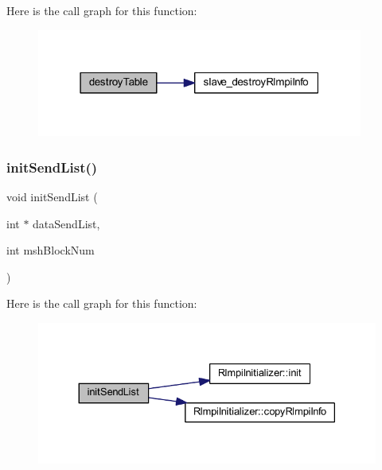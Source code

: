 Here is the call graph for this function\+:
\nopagebreak
\begin{figure}[H]
\begin{center}
\leavevmode
\includegraphics[width=304pt]{tools_2RL__MPI_2register_8H_a099f07ebad307cc1509766f32cfcba5f_cgraph}
\end{center}
\end{figure}
\mbox{\label{tools_2RL__MPI_2register_8H_a4e113cf30f6198d50fb212074effcc61}} 
\subsubsection{\texorpdfstring{initSendList()}{initSendList()}\hspace{0.1cm}{\footnotesize\ttfamily [1/2]}}
{\footnotesize\ttfamily void init\+Send\+List (\begin{DoxyParamCaption}\item[{int $\ast$}]{data\+Send\+List,  }\item[{int}]{msh\+Block\+Num }\end{DoxyParamCaption})}

Here is the call graph for this function\+:
\nopagebreak
\begin{figure}[H]
\begin{center}
\leavevmode
\includegraphics[width=330pt]{tools_2RL__MPI_2register_8H_a4e113cf30f6198d50fb212074effcc61_cgraph}
\end{center}
\end{figure}
\mbox{\label{tools_2RL__MPI_2register_8H_ace23239002b4fdf135d4ad20ae2df6e7}} 
